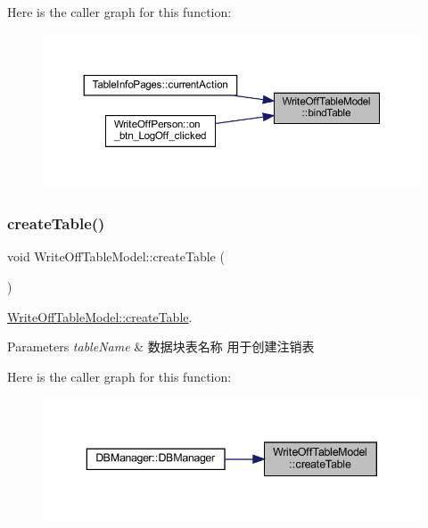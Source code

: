 Here is the caller graph for this function\+:
\nopagebreak
\begin{figure}[H]
\begin{center}
\leavevmode
\includegraphics[width=350pt]{class_write_off_table_model_a188ceddedd586ee4b6eef04c37a20da3_icgraph}
\end{center}
\end{figure}
\mbox{\label{class_write_off_table_model_a719a7bea132024eb650e1d568566a9ce}} 
\subsubsection{\texorpdfstring{createTable()}{createTable()}}
{\footnotesize\ttfamily void Write\+Off\+Table\+Model\+::create\+Table (\begin{DoxyParamCaption}{ }\end{DoxyParamCaption})}



\mbox{\hyperlink{class_write_off_table_model_a719a7bea132024eb650e1d568566a9ce}{Write\+Off\+Table\+Model\+::create\+Table}}. 


\begin{DoxyParams}{Parameters}
{\em table\+Name} & 数据块表名称 用于创建注销表 \\
\hline
\end{DoxyParams}
Here is the caller graph for this function\+:
\nopagebreak
\begin{figure}[H]
\begin{center}
\leavevmode
\includegraphics[width=343pt]{class_write_off_table_model_a719a7bea132024eb650e1d568566a9ce_icgraph}
\end{center}
\end{figure}
\mbox{\label{class_write_off_table_model_a7131d818db04f4bd4cc6aac041318741}} 
